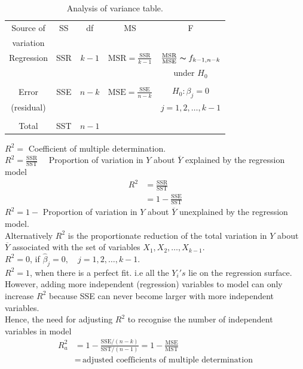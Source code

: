 \documentclass[11pt,a4paper]{article}
\theoremstyle{definition}
\begin{document}
\begin{table}[H]
\centering
\begin{tabular}{|c|c|c|c|c|}
\hline
Source of & SS & df & MS & F\\
variation & & & &\\
\hline
Regression & SSR & $k-1$ & $\text{MSR}=\frac{\text{SSR}}{k-1}$ & $\frac{\text{MSR}}{\text{MSE}}\thicksim f_{k-1,n-k}$ \\
&&&& under $H_0$\\
&&&&\\
Error & SSE & $n-k$ & $\text{MSE}=\frac{\text{SSE}}{n-k}$ & $H_0:\beta_j=0$\\
(residual) &&&& $j=1,2,\ldots ,k-1$\\
&&&&\\
Total & SST & $n-1$ &&\\
\hline
\end{tabular}
\caption{Analysis of variance table.}
\end{table}


$R^2=$ Coefficient of multiple determination.\\

$R^2=\frac{\text{SSR}}{\text{SST}}\quad $ Proportion of variation in $Y$ about $\overline{Y}$ explained by the regression model
\begin{align*}
R^2 & = \frac{\text{SSR}}{\text{SST}}\\
    & = 1-\frac{\text{SSE}}{\text{SST}}
\end{align*}
$R^2=1-$ Proportion of variation in $Y$ about $\overline{Y}$ unexplained by the regression model.\\


Alternatively $R^2$ is the proportionate reduction of the total variation in $Y$ about $\overline{Y}$ associated with the set of variables $X_1,X_2,\ldots , X_{k-1}$.\\

$R^2=0$, if $\hat{\beta}_j=0,\quad  j=1,2,\ldots ,k-1$.\\

$R^2=1$, when there is a perfect fit. i.e all the $Y_i's$ lie on the regression surface.\\

However, adding more independent (regression) variables to model can only increase $R^2$ because SSE can never become larger with more independent variables.\\
Hence, the need for adjusting $R^2$ to recognise the number of independent variables in model 
\begin{align*}
R^2_a & = 1-\frac{\text{SSE}/(n-k)}{\text{SST}/(n-1)}=1-\frac{\text{MSE}}{\text{MST}}\\
      & = \,\text{adjusted coefficients of multiple determination}\\
\end{align*}
\end{document}
